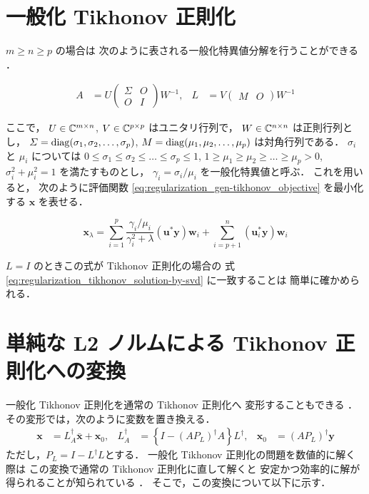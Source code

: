 \section{一般化 Tikhonov 正則化}

$m \ge n \ge p$ の場合は
次のように表される一般化特異値分解を行うことができる \cite{Hansen1998}．

\begin{align}
    A       & =U
    \begin{pmatrix}
        \Sigma & O \\
        O      & I
    \end{pmatrix}
    W^{-1}, &
    L       & =V
    \begin{pmatrix}
        M & O
    \end{pmatrix}
    W^{-1}
\end{align}

ここで，
$U \in \mathbb{C}^{m \times n}$,
$V \in \mathbb{C}^{p \times p}$
はユニタリ行列で，
$W \in \mathbb{C}^{n \times n}$
は正則行列とし，
$\varSigma = \operatorname{diag}(\sigma_1, \sigma_2, \ldots, \sigma_p)$,
$M = \operatorname{diag}(\mu_1, \mu_2, \ldots, \mu_p)$
は対角行列である．
$\sigma_i$ と $\mu_i$ については
$0 \le \sigma_1 \le \sigma_2 \le \ldots \le \sigma_p \le 1$,
$1 \ge \mu_1 \ge \mu_2 \ge \ldots \ge \mu_p > 0$,
$\sigma_i^2 + \mu_i^2 = 1$
を満たすものとし，
$\gamma_i = \sigma_i / \mu_i$
を一般化特異値と呼ぶ．
これを用いると，
次のように評価関数 \eqref{eq:regularization_gen-tikhonov_objective} を最小化する
$\bm{x}$ を表せる\cite{Hansen1998}．

\begin{equation}
    \bm{x}_\lambda =
    \sum_{i=1}^{p} \frac{\gamma_i / \mu_i}{\gamma_i^2+\lambda}
    (\bm{u}^*\bm{y}) \bm{w}_i
    +\sum_{i=p+1}^n (\bm{u}_i^*\bm{y}) \bm{w}_i
\end{equation}

$L=I$ のときこの式が Tikhonov 正則化の場合の
式 \eqref{eq:regularization_tikhonov_solution-by-svd} に一致することは
簡単に確かめられる．

\section{単純な L2 ノルムによる Tikhonov 正則化への変換}

一般化 Tikhonov 正則化を通常の Tikhonov 正則化へ
変形することもできる \cite{Hansen1998}．
その変形では，次のように変数を置き換える．
\begin{align}
    \bm{x}              & = L_A^\dagger\bar{\bm{x}}+\bm{x}_0, &
    L_A^\dagger         & = \left\{
    I-\left(AP_L\right)^\dagger A
    \right\} L^\dagger, &
    \bm{x}_0            & = \left(AP_L\right)^\dagger \bm{y}
    \label{eq_GTik_arr}
\end{align}
ただし，$P_L=I-L^\dagger L$とする．
一般化 Tikhonov 正則化の問題を数値的に解く際は
この変換で通常の Tikhonov 正則化に直して解くと
安定かつ効率的に解が得られることが知られている \cite{Hansen1998}．
そこで，この変換について以下に示す．

